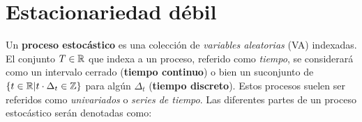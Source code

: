 %
%
%

\section{Estacionariedad débil}

Un \textbf{proceso estocástico} \xt es una colección de \textit{variables 
aleatorias} (VA) indexadas.
%
El conjunto $T \in \mathbb{R}$ que indexa a un proceso, referido como \textit{tiempo}, se considerará como 
un intervalo cerrado (\textbf{tiempo continuo}) o bien un suconjunto de 
$\left\{ t \in \mathbb{R} | {t} \cdot {\Delta_t} \in \mathbb{Z} \right\} $  para algún $\Delta_t$ 
(\textbf{tiempo discreto}).
Estos procesos suelen ser referidos como \textit{univariados} o \textit{series de tiempo}.
%
Las diferentes partes de un proceso estocástico serán denotadas como:\\

